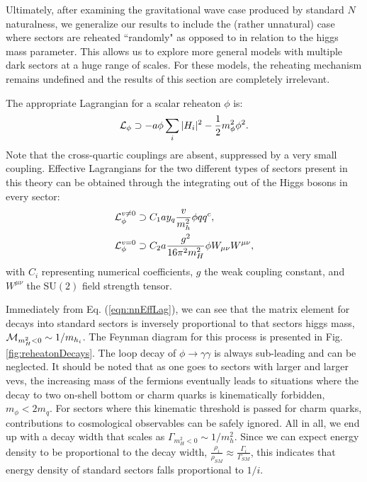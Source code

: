 \documentclass[nofootinbib,twocolumn,preprintnumbers]{revtex4-1}
\begin{document}
Ultimately, after examining the gravitational wave case produced by standard $N$naturalness, we generalize our results to include the (rather unnatural) case where sectors are reheated ``randomly" as opposed to in relation to the higgs mass parameter. This allows us to explore more general models with multiple dark sectors at a huge range of scales. For these models, the reheating mechanism remains undefined and the results of this section are completely irrelevant. 

The appropriate Lagrangian for a scalar reheaton $\phi$ is: 
\begin{equation}\label{eqn:nnLagrangian}
{\cal L}_\phi \supset -a\phi\sum_i\vert H_i\vert^2 - \frac{1}{2}m^2_\phi \phi^2.
\end{equation}
Note that the cross-quartic couplings are absent, suppressed by a very small coupling. Effective Lagrangians for the two different types of sectors present in this theory can be obtained through the integrating out of the Higgs bosons in every sector:
\begin{equation}\label{eqn:nnEffLag}
\begin{split}
{\cal L}_\phi^{v \neq 0} &\supset C_1 a y_q\frac{v}{m_h^2}\phi q q^c,
\\
{\cal L}_\phi^{v = 0} &\supset C_2 a \frac{g^2}{16\pi^2 m_H^2}\phi W_{\mu\nu}W^{\mu\nu},
\end{split}
\end{equation}
with $C_i$ representing numerical coefficients, $g$ the weak coupling constant, and $W^{\mu\nu}$ the SU$(2)$ field strength tensor.

Immediately from Eq. (\ref{eqn:nnEffLag}), we can see that the matrix element for decays into standard sectors is inversely proportional to that sectors higgs mass, ${\cal M}_{m_H^2 < 0} \sim 1/m_{h_i}$. The Feynman diagram for this process is presented in Fig. \ref{fig:reheatonDecays}. The loop decay of $\phi \rightarrow \gamma\gamma$ is always sub-leading and can be neglected. It should be noted that as one goes to sectors with larger and larger vevs, the increasing mass of the fermions eventually leads to situations where the decay to two on-shell bottom or charm quarks is kinematically forbidden, $m_\phi < 2 m_q$.  For sectors where this kinematic threshold is passed for charm quarks, contributions to cosmological observables can be safely ignored. All in all, we end up with a decay width that scales as $\Gamma_{m_H^2<0} \sim 1/m_h^2$. Since we can expect energy density to be proportional to the decay width, $\frac{\rho_i}{\rho_{SM}} \approx \frac{\Gamma_i}{\Gamma_{SM}}$, this indicates that energy density of standard sectors falls proportional to $1/i$. 
\end{document}
